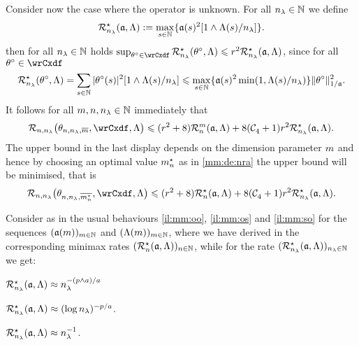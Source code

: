 Consider now the case where the operator is unknown.
For all $\ssE\in\Nz$ we define
\begin{equation}\label{oo:de:mra}
  \mmRa{\xdfCw[],\Lambda}:=\max_{s\in\Nz}\{\xdfCw[(s)]^2[1\wedge \iSv[s]/\ssE]\}.
\end{equation}
then for all $\ssE\in\Nz$ holds
$\sup_{\xdf\in\rwCxdf}\mmRa{\xdf,\Lambda}\leq
\xdfCr^2\mmRa{\xdfCw[],\Lambda}$, since for all
$\xdf\in\rwCxdf$ 
\begin{equation}\label{oo:e8}
  \mmRa{\xdf,\Lambda}=\sum_{s\in\Nz} \vert \fxdf[(s)] \vert ^2[1\wedge \iSv[s]/\ssE]\leq
\max_{s\in\Nz}\{\xdfCw[(s)]^2\min(1,\iSv[s]/\ssE)\}\Vnorm[1/{\xdfCw[]}]{\xdf}^2.
\end{equation}
It follows for all $\Di,\ssY,\ssE\in\Nz$ immediately that 
\begin{equation}\label{oo:e9}
  \nmRi{\hxdfPr}{\rwCxdf,\Lambda}
  \leq (\xdfCr^2+8) \dRa{\Di}{\xdfCw[],\Lambda}+8(\cst{4}+1)\xdfCr^2\mmRa{\xdfCw[],\Lambda}.
\end{equation}
The upper bound in the last display depends on the dimension parameter
$\Di$ and hence by choosing an optimal value $\mnDi$ as in
\eqref{mm:de:nra} the upper bound
will be minimised, that is
\begin{equation}\label{oo:e10}
  \nmRi{\hxdfPr[\mnDi]}{\rwCxdf,\Lambda}
  \leq (\xdfCr^2+8) \mnRa{\xdfCw[],\Lambda}+8(\cst{4}+1)\xdfCr^2\mmRa{\xdfCw[],\Lambda}.
\end{equation}

\begin{il}\label{au:il:mm}
  Consider as in  the usual
  behaviours \ref{il:mm:oo}, \ref{il:mm:os} and \ref{il:mm:so} for the
  sequences $\Nsuite[\Di]{\xdfCw}$ and $\Nsuite[\Di]{\iSv[\Di]}$,
  where we have derived in   the corresponding minimax
  rates $\Nsuite[\ssY]{\mnRa{\xdfCw[],\Lambda}}$, while for  the rate
  $\Nsuite[\ssE]{\mmRa{\xdfCw[],\Lambda}}$ we get:
\begin{Liste}[]
\item[\mylabel{au:il:mm:oo}{\dg\bfseries{[o-o]}}]  
$\mmRa{\xdfCw[],\Lambda}\approx\ssE^{-(p\wedge a)/a}$
\item[\mylabel{au:il:mm:os}{\dg\bfseries{[o-s]}}]
 $\mmRa{\xdfCw[],\Lambda}\approx(\log\ssE)^{-p/a}$.
\item[\mylabel{au:il:mm:so}{\dg\bfseries{[s-o]}}] 
 $\mmRa{\xdfCw[],\Lambda}\approx \ssE^{-1}$.\ilEnd
\end{Liste}
\end{il}

